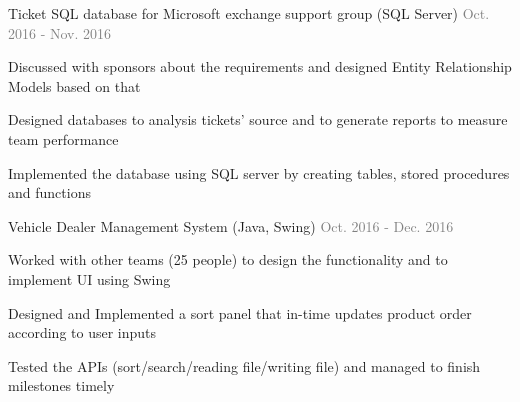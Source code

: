 \begin{cventries}

  \cventry
    {}
    {Ticket SQL database for Microsoft exchange support group  (SQL Server)} %
    {
      \textcolor{graytext}{Oct. 2016 - Nov. 2016} %
    }
    {}
    {}

  \vspace{-15mm}
  \cventry
    {}
    {}
    {}
    {}
    {
      \begin{cvitems} %
        \item {Discussed with sponsors about the requirements and designed Entity Relationship Models based on that}
        \item {Designed databases to analysis tickets’ source and to generate reports to measure team performance}
        \item {Implemented the database using SQL server by creating tables, stored procedures and functions}
      \end{cvitems}
    }


  \cventry
    {}
    {Vehicle Dealer Management System (Java, Swing)} %
    {
      \textcolor{graytext}{Oct. 2016 - Dec. 2016} %
    }
    {}
    {}

  \vspace{-15mm}
  \cventry
    {}
    {}
    {}
    {}
    {
      \begin{cvitems} %
        \item {Worked with other teams (25 people) to design the functionality and to implement UI using Swing}
        \item {Designed and Implemented a sort panel that in-time updates product order according to user inputs}
        \item {Tested the APIs (sort/search/reading file/writing file) and managed to finish milestones timely}
      \end{cvitems}
    }
  \vspace{-4mm}


\end{cventries}
